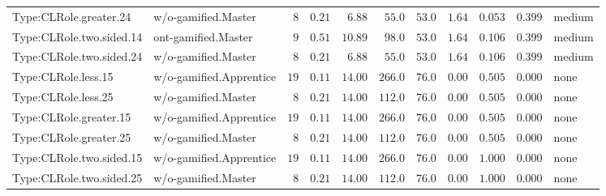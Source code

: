 \documentclass[6pt,a4paper]{article}
\begin{document}
{\begin{longtable}{llrrrrrrrrl}
Type:CLRole.greater.24&w/o-gamified.Master&$ 8$&$0.21$&$ 6.88$&$ 55.0$&$ 53.0$&$ 1.64$&$0.053$&$0.399$&medium\tabularnewline
Type:CLRole.two.sided.14&ont-gamified.Master&$ 9$&$0.51$&$10.89$&$ 98.0$&$ 53.0$&$ 1.64$&$0.106$&$0.399$&medium\tabularnewline
Type:CLRole.two.sided.24&w/o-gamified.Master&$ 8$&$0.21$&$ 6.88$&$ 55.0$&$ 53.0$&$ 1.64$&$0.106$&$0.399$&medium\tabularnewline
Type:CLRole.less.15&w/o-gamified.Apprentice&$19$&$0.11$&$14.00$&$266.0$&$ 76.0$&$ 0.00$&$0.505$&$0.000$&none\tabularnewline
Type:CLRole.less.25&w/o-gamified.Master&$ 8$&$0.21$&$14.00$&$112.0$&$ 76.0$&$ 0.00$&$0.505$&$0.000$&none\tabularnewline
Type:CLRole.greater.15&w/o-gamified.Apprentice&$19$&$0.11$&$14.00$&$266.0$&$ 76.0$&$ 0.00$&$0.505$&$0.000$&none\tabularnewline
Type:CLRole.greater.25&w/o-gamified.Master&$ 8$&$0.21$&$14.00$&$112.0$&$ 76.0$&$ 0.00$&$0.505$&$0.000$&none\tabularnewline
\newpage
Type:CLRole.two.sided.15&w/o-gamified.Apprentice&$19$&$0.11$&$14.00$&$266.0$&$ 76.0$&$ 0.00$&$1.000$&$0.000$&none\tabularnewline
Type:CLRole.two.sided.25&w/o-gamified.Master&$ 8$&$0.21$&$14.00$&$112.0$&$ 76.0$&$ 0.00$&$1.000$&$0.000$&none\tabularnewline
\hline
\end{longtable}}
\end{document}
